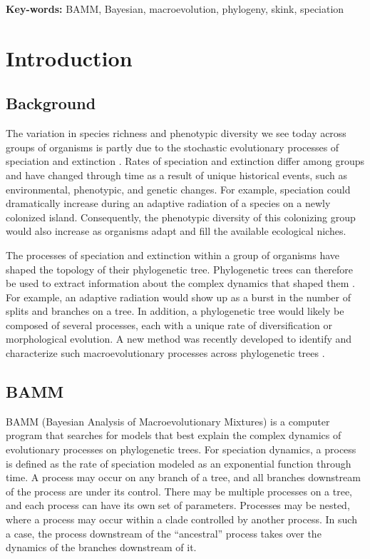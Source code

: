\documentclass[12pt]{article}
\begin{document}
\begin{flushleft}
\textbf{Key-words:} BAMM, Bayesian, macroevolution, phylogeny, skink, speciation
\end{flushleft}


\pagebreak[4]


\section*{Introduction}

\subsection*{Background}

The variation in species richness and phenotypic diversity we see today
across groups of organisms is partly due to the stochastic
evolutionary processes of speciation and extinction \citep{rab14plos}.
%
Rates of speciation and extinction differ among groups
and have changed through time as a result of unique historical events,
such as environmental, phenotypic, and genetic changes.
%
For example, speciation could dramatically increase
during an adaptive radiation of a species on a newly colonized island.
%
Consequently, the phenotypic diversity of this colonizing group
would also increase as organisms adapt and fill
the available ecological niches.


The processes of speciation and extinction within a group of organisms
have shaped the topology of their phylogenetic tree.
%
Phylogenetic trees can therefore be used to extract
information about the complex dynamics that shaped them \citep{rab14plos}.
%
For example, an adaptive radiation would show up
as a burst in the number of splits and branches on a tree.
%
In addition, a phylogenetic tree would likely be composed of several processes,
each with a unique rate of diversification or morphological evolution.
%
A new method was recently developed to identify and characterize
such macroevolutionary processes across phylogenetic trees \citep{rab14plos}.


\subsection*{BAMM}

BAMM (Bayesian Analysis of Macroevolutionary Mixtures)
is a computer program that searches for models that best explain
the complex dynamics of evolutionary processes on phylogenetic trees.
%
For speciation dynamics, a process is defined as the rate of speciation
modeled as an exponential function through time.
%
A process may occur on any branch of a tree,
and all branches downstream of the process are under its control.
%
There may be multiple processes on a tree,
and each process can have its own set of parameters.
%
Processes may be nested, where a process may occur
within a clade controlled by another process.
%
In such a case, the process downstream of the ``ancestral'' process
takes over the dynamics of the branches downstream of it.
\end{document}
